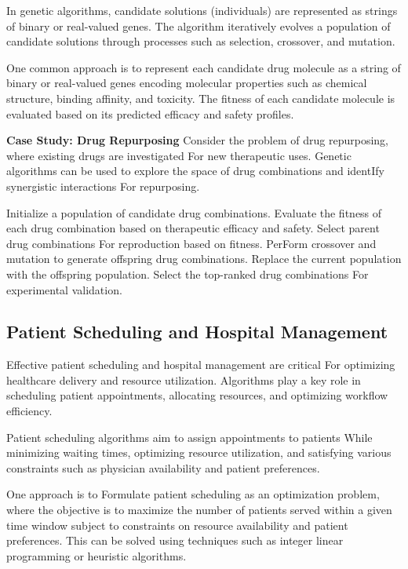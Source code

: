 \documentclass[12pt]{book} %
\begin{document}
In genetic algorithms, candidate solutions (individuals) are represented as strings of binary or real-valued genes. The algorithm iteratively evolves a population of candidate solutions through processes such as selection, crossover, and mutation.

One common approach is to represent each candidate drug molecule as a string of binary or real-valued genes encoding molecular properties such as chemical structure, binding affinity, and toxicity. The fitness of each candidate molecule is evaluated based on its predicted efficacy and safety profiles.

\textbf{Case Study: Drug Repurposing}
Consider the problem of drug repurposing, where existing drugs are investigated For new therapeutic uses. Genetic algorithms can be used to explore the space of drug combinations and identIfy synergistic interactions For repurposing.
\FloatBarrier
\begin{algorithm}
\caption{Genetic Algorithm For Drug Repurposing}
\begin{algorithmic}[1]
\State Initialize a population of candidate drug combinations.
    \State Evaluate the fitness of each drug combination based on therapeutic efficacy and safety.
    \State Select parent drug combinations For reproduction based on fitness.
    \State PerForm crossover and mutation to generate offspring drug combinations.
    \State Replace the current population with the offspring population.
\EndFor
\State Select the top-ranked drug combinations For experimental validation.
\end{algorithmic}
\end{algorithm}
\FloatBarrier
\subsection{Patient Scheduling and Hospital Management}
Effective patient scheduling and hospital management are critical For optimizing healthcare delivery and resource utilization. Algorithms play a key role in scheduling patient appointments, allocating resources, and optimizing workflow efficiency.

Patient scheduling algorithms aim to assign appointments to patients While minimizing waiting times, optimizing resource utilization, and satisfying various constraints such as physician availability and patient preferences.

One approach is to Formulate patient scheduling as an optimization problem, where the objective is to maximize the number of patients served within a given time window subject to constraints on resource availability and patient preferences. This can be solved using techniques such as integer linear programming or heuristic algorithms.
\end{document}
